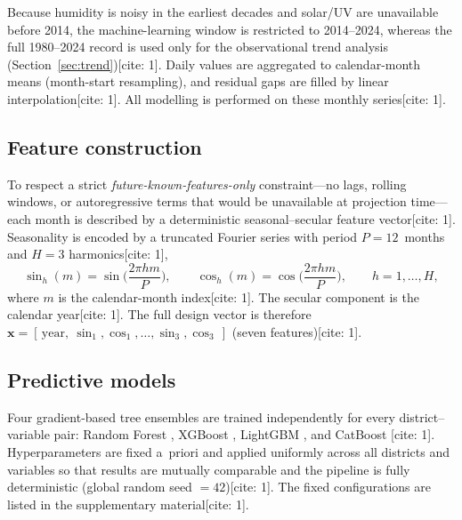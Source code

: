 \documentclass[pdflatex,sn-mathphys-ay]{sn-jnl}
\begin{document}
Because humidity is noisy in the earliest decades and solar/UV are unavailable before 2014, the machine-learning window is restricted to 2014--2024, whereas the full 1980--2024 record is used only for the observational trend analysis (Section~\ref{sec:trend})[cite: 1]. Daily values are aggregated to calendar-month means (month-start resampling), and residual gaps are filled by linear interpolation[cite: 1]. All modelling is performed on these monthly series[cite: 1].

\subsection{Feature construction}\label{sec:features}
To respect a strict \emph{future-known-features-only} constraint---no lags, rolling windows, or autoregressive terms that would be unavailable at projection time---each month is described by a deterministic seasonal--secular feature vector[cite: 1]. Seasonality is encoded by a truncated Fourier series with period $P=12$~months and $H=3$ harmonics[cite: 1],
\begin{equation}
\sin_{h}(m)=\sin\!\Big(\frac{2\pi h m}{P}\Big),\qquad
\cos_{h}(m)=\cos\!\Big(\frac{2\pi h m}{P}\Big),\qquad h=1,\dots,H,
\end{equation}
where $m$ is the calendar-month index[cite: 1]. The secular component is the calendar year[cite: 1]. The full design vector is therefore $\mathbf{x}=[\,\mathrm{year},\ \sin_{1},\cos_{1},\dots,\sin_{3},\cos_{3}\,]$ (seven features)[cite: 1].

\subsection{Predictive models}\label{sec:models}
Four gradient-based tree ensembles are trained independently for every district--variable pair: Random Forest \citep{Breiman2001}, XGBoost \citep{chen2016xgboost}, LightGBM \citep{ke2017lightgbm}, and CatBoost \citep{prokhorenkova2018catboost}[cite: 1]. Hyperparameters are fixed a~priori and applied uniformly across all districts and variables so that results are mutually comparable and the pipeline is fully deterministic (global random seed $=42$)[cite: 1]. The fixed configurations are listed in the supplementary material[cite: 1].
\end{document}
